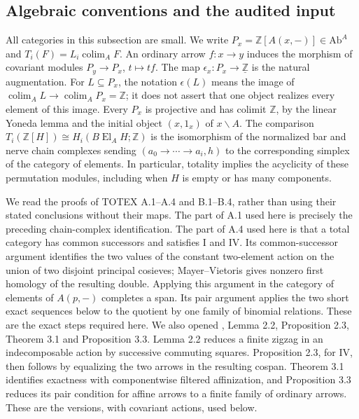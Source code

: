 \subsection{Algebraic conventions and the audited input}
All categories in this subsection are small.  We write
$P_x=\mathbb Z[A(x,-)]\in\mathrm{Ab}^A$ and
$T_i(F)=L_i\operatorname{colim}_A F$.  An ordinary arrow $f:x\to y$
induces the morphism of covariant modules
$P_y\to P_x$, $t\mapsto tf$.  The map $\epsilon_x:P_x\to
\underline{\mathbb Z}$ is the natural augmentation.  For
$L\subseteq P_x$, the notation $\epsilon(L)$ means the image of
$\operatorname{colim}_A L\to\operatorname{colim}_A P_x=\mathbb Z$;
it does not assert that one object realizes every element of this image.
Every $P_x$ is projective and has colimit $\mathbb Z$, by the linear
Yoneda lemma and the initial object $(x,1_x)$ of $x\backslash A$.
The comparison $T_i(\mathbb Z[H])\cong
H_i(B\operatorname{El}_A H;\mathbb Z)$ is the isomorphism of the
normalized bar and nerve chain complexes sending
$(a_0\to\cdots\to a_i,h)$ to the corresponding simplex of the
category of elements.  In particular, totality implies the acyclicity
of these permutation modules, including when $H$ is empty or has many
components.

We read the proofs of TOTEX A.1--A.4 and B.1--B.4, rather than using
their stated conclusions without their maps.  The part of A.1 used here
is precisely the preceding chain-complex identification.  The part of
A.4 used here is that a total category has common successors and
satisfies I and IV.  Its common-successor argument identifies the two
values of the constant two-element action on the union of two disjoint
principal cosieves; Mayer--Vietoris gives nonzero first homology of the
resulting double.  Applying this argument in the category of elements of
$A(p,-)$ completes a span.  Its pair argument applies the two short
exact sequences below to the quotient by one family of binomial
relations.  These are the exact steps required here.  We also opened
\cite{IsbellMitchell1976}, Lemma 2.2, Proposition 2.3, Theorem 3.1 and
Proposition 3.3.  Lemma 2.2 reduces a finite zigzag in an indecomposable
action by successive commuting squares.  Proposition 2.3, for IV, then
follows by equalizing the two arrows in the resulting cospan.  Theorem
3.1 identifies exactness with componentwise filtered affinization, and
Proposition 3.3 reduces its pair condition for affine arrows to a finite
family of ordinary arrows.  These are the versions, with covariant
actions, used below.

